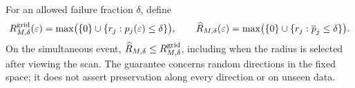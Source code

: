 For an allowed failure fraction $\delta$, define
\[
 R^{\rm grid}_{M,\delta}(\varepsilon)
 =\max\bigl(\{0\}\cup\{r_j:p_j(\varepsilon)\le\delta\}\bigr),\qquad
 \widehat R_{M,\delta}(\varepsilon)
 =\max\bigl(\{0\}\cup\{r_j:\overline p_j\le\delta\}\bigr).
\]
On the simultaneous event, $\widehat R_{M,\delta}\le R^{\rm grid}_{M,\delta}$, including when the radius is selected after viewing the scan. The guarantee concerns random directions in the fixed space; it does not assert preservation along every direction or on unseen data.

